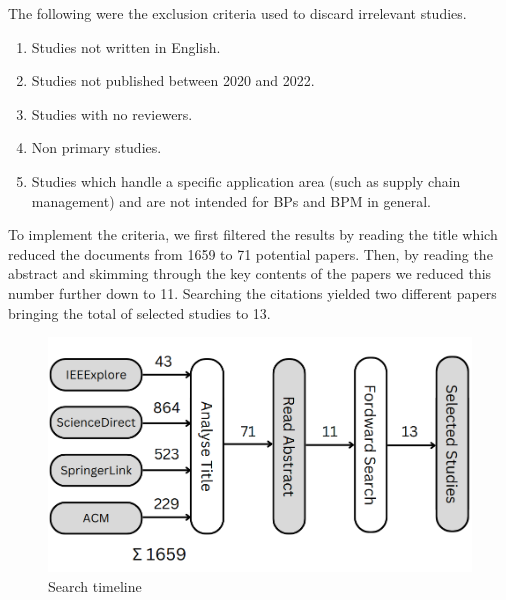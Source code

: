 \noindent The following were the exclusion criteria used to discard irrelevant studies.
\begin{enumerate}
    \item Studies not written in English.
    \item Studies not published between 2020 and 2022.
    \item Studies with no reviewers.
    \item Non primary studies.
    \item Studies which handle a specific application area (such as supply chain management) and are not intended for BPs and BPM in general.
\end{enumerate}
To implement the criteria, we first filtered the results by reading the title which reduced the documents from 1659 to 71 potential papers. Then, by reading the abstract and skimming through the key contents of the papers we reduced this number further down to 11. Searching the citations yielded two different papers bringing the total of selected studies to 13.

\begin{figure}
    \centering
    \includegraphics[width=\textwidth]{search-final.png}
    \caption{Search timeline}
    \label{fig:search}
\end{figure}
